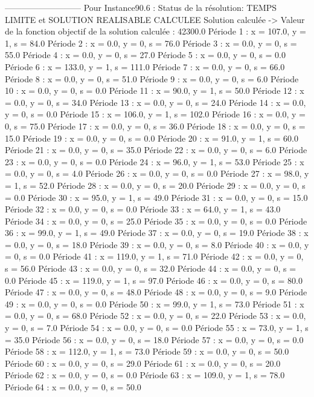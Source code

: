 ---------------------------
Pour Instance90.6  :
Status de la résolution: TEMPS LIMITE et SOLUTION REALISABLE CALCULEE
Solution calculée
-> Valeur de la fonction objectif de la solution calculée :  42300.0
Période 1 : x = 107.0, y = 1, s = 84.0
Période 2 : x = 0.0, y = 0, s = 76.0
Période 3 : x = 0.0, y = 0, s = 55.0
Période 4 : x = 0.0, y = 0, s = 27.0
Période 5 : x = 0.0, y = 0, s = 0.0
Période 6 : x = 133.0, y = 1, s = 111.0
Période 7 : x = 0.0, y = 0, s = 66.0
Période 8 : x = 0.0, y = 0, s = 51.0
Période 9 : x = 0.0, y = 0, s = 6.0
Période 10 : x = 0.0, y = 0, s = 0.0
Période 11 : x = 90.0, y = 1, s = 50.0
Période 12 : x = 0.0, y = 0, s = 34.0
Période 13 : x = 0.0, y = 0, s = 24.0
Période 14 : x = 0.0, y = 0, s = 0.0
Période 15 : x = 106.0, y = 1, s = 102.0
Période 16 : x = 0.0, y = 0, s = 75.0
Période 17 : x = 0.0, y = 0, s = 36.0
Période 18 : x = 0.0, y = 0, s = 15.0
Période 19 : x = 0.0, y = 0, s = 0.0
Période 20 : x = 91.0, y = 1, s = 60.0
Période 21 : x = 0.0, y = 0, s = 35.0
Période 22 : x = 0.0, y = 0, s = 6.0
Période 23 : x = 0.0, y = 0, s = 0.0
Période 24 : x = 96.0, y = 1, s = 53.0
Période 25 : x = 0.0, y = 0, s = 4.0
Période 26 : x = 0.0, y = 0, s = 0.0
Période 27 : x = 98.0, y = 1, s = 52.0
Période 28 : x = 0.0, y = 0, s = 20.0
Période 29 : x = 0.0, y = 0, s = 0.0
Période 30 : x = 95.0, y = 1, s = 49.0
Période 31 : x = 0.0, y = 0, s = 15.0
Période 32 : x = 0.0, y = 0, s = 0.0
Période 33 : x = 64.0, y = 1, s = 43.0
Période 34 : x = 0.0, y = 0, s = 25.0
Période 35 : x = 0.0, y = 0, s = 0.0
Période 36 : x = 99.0, y = 1, s = 49.0
Période 37 : x = 0.0, y = 0, s = 19.0
Période 38 : x = 0.0, y = 0, s = 18.0
Période 39 : x = 0.0, y = 0, s = 8.0
Période 40 : x = 0.0, y = 0, s = 0.0
Période 41 : x = 119.0, y = 1, s = 71.0
Période 42 : x = 0.0, y = 0, s = 56.0
Période 43 : x = 0.0, y = 0, s = 32.0
Période 44 : x = 0.0, y = 0, s = 0.0
Période 45 : x = 119.0, y = 1, s = 97.0
Période 46 : x = 0.0, y = 0, s = 80.0
Période 47 : x = 0.0, y = 0, s = 48.0
Période 48 : x = 0.0, y = 0, s = 9.0
Période 49 : x = 0.0, y = 0, s = 0.0
Période 50 : x = 99.0, y = 1, s = 73.0
Période 51 : x = 0.0, y = 0, s = 68.0
Période 52 : x = 0.0, y = 0, s = 22.0
Période 53 : x = 0.0, y = 0, s = 7.0
Période 54 : x = 0.0, y = 0, s = 0.0
Période 55 : x = 73.0, y = 1, s = 35.0
Période 56 : x = 0.0, y = 0, s = 18.0
Période 57 : x = 0.0, y = 0, s = 0.0
Période 58 : x = 112.0, y = 1, s = 73.0
Période 59 : x = 0.0, y = 0, s = 50.0
Période 60 : x = 0.0, y = 0, s = 29.0
Période 61 : x = 0.0, y = 0, s = 20.0
Période 62 : x = 0.0, y = 0, s = 0.0
Période 63 : x = 109.0, y = 1, s = 78.0
Période 64 : x = 0.0, y = 0, s = 50.0
